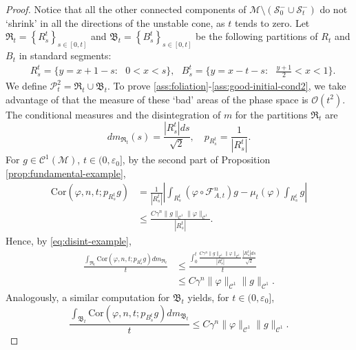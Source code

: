 \documentclass{amsart}
\numberwithin{equation}{section}
\newcommand\ve{\varepsilon}
\newcommand\vf{\varphi}
\renewcommand{\le}{\leqslant}
\newcommand\cC{{\mathcal C}}
\newcommand\cF{{\mathcal F}}
\newcommand\cO{{\mathcal O}}
\newcommand\cM{{\mathcal M}}
\newcommand\cS{{\mathcal S}}
\newcommand{\catt}{\cF_{A,t}}
\newcommand{\cov}{ \text{Cor} }
\begin{document}
\begin{proof}
Notice that all the other connected components of \(\cM \setminus (\cS_0^- \cup \cS_t^{-})\) do not `shrink' in all the directions of the unstable cone, as \(t\) tends to zero. Let \(\mathfrak R_t = \left\{R_s^t\right\}_{s \in [0,t]}\) and \(\mathfrak B_t = \left\{B_s^t\right\}_{s \in [0,t]}\) be the following partitions of \(R_t\) and \(B_t\) in standard segments:
\begin{equation}\label{eq:partition-triangles}
\begin{split}
 &R_{s}^t = \bigl\{ y =  x + 1-s: \text{ } 0 < x < s  \bigr\}, \text{ } B_s^t = \bigl\{ y =  x -t- s: \text{ } \frac{y+1}{2} < x < 1  \bigr\}.
\end{split}
\end{equation}
We define \(\mathscr P_{t}^2 = \mathfrak R_t \cup \mathfrak B_t\). To prove  \ref{ass:foliation}-\ref{ass:good-initial-cond2}, we take advantage of that the measure of these `bad' areas of the phase space is \(\cO(t^2)\). The conditional measures and the disintegration of \(m\) for the partitions \(\mathfrak R_t\) are
\begin{equation}\label{eq:disint-example}
   dm_{\mathfrak R_{t}}(s) = \frac{|R_s^t| ds}{\sqrt 2}, \quad p_{R_s^t} = \frac{1}{|R_s^t|}.
\end{equation}
For \(g \in \cC^1(\cM)\), \(t \in (0,\ve_0]\), by the second part of Proposition \ref{prop:fundamental-example},
\[
\begin{split}
    \cov(\vf, n, t; p_{R_s^t} g) &= \frac{1}{|R_s^t|}\left|\int_{R_s^t} (\vf \circ \catt^n) g  -  \mu_t(\vf) \int_{R_s^t} g\right|\\
& \le\frac{ C \gamma^n \|g\|_{\cC^1}\|\vf\|_{\cC^1}}{|R_s^t|}.
\end{split}
\]
Hence, by \eqref{eq:disint-example},
\begin{equation}\label{eq:decay-red}
\begin{split}
\frac{\int_{\mathfrak R_t} \cov(\vf, n, t; p_{R_s^t} g) dm_{\mathfrak R_t} }{t} &\le \frac{\int_{0}^t   \frac{C \gamma^n\|g\|_{\cC^1}\|\vf\|_{\cC^1}}{|R_s^t|}\frac{|R_s^t| ds}{\sqrt 2}}{t} \\
&\le C \gamma^n \|\vf\|_{\cC^1}\|g\|_{\cC^1}.
\end{split}
\end{equation}
Analogously, a similar computation for \(\mathfrak B_t\) yields, for \(t \in (0, \ve_0]\),
\begin{equation}\label{eq:decay-blu}
\frac{\int_{\mathfrak B_t} \cov(\vf, n, t; p_{B_s^t} g) dm_{\mathfrak B_t} }{t} \le C \gamma^n \|\vf\|_{\cC^1}\|g\|_{\cC^1}.

\end{equation}
\end{proof}
\end{document}
